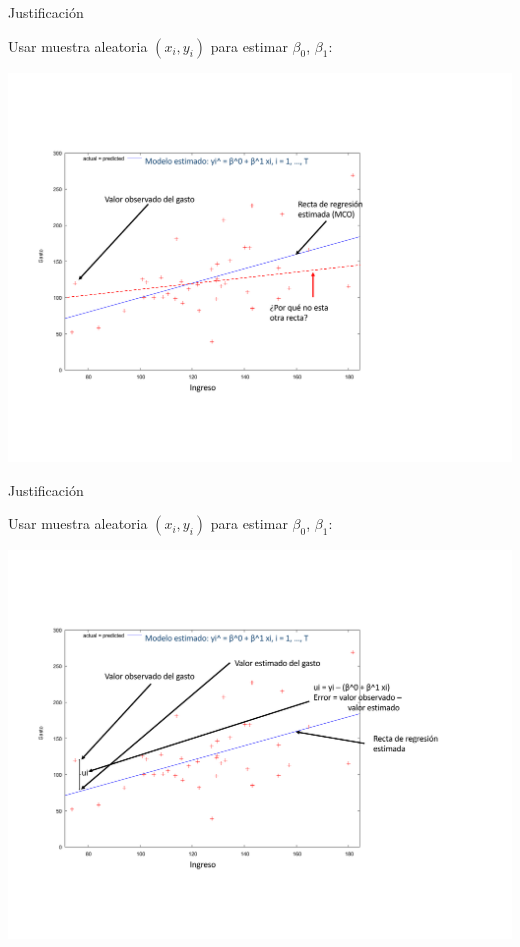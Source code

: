 \documentclass[11pt,handout]{beamer}
\begin{document}
\begin{frame}
{Justificación}

\pause 

Usar muestra aleatoria $(x_i, y_i)$ para estimar $\beta_0$, $\beta_1$:

\pause 
\vspace{-2cm}
\begin{center}
	\includegraphics[scale=.45]{fig2-11.pdf} 
\end{center}

\end{frame}

\begin{frame}
{Justificación}

\pause 

Usar muestra aleatoria $(x_i, y_i)$ para estimar $\beta_0$, $\beta_1$:

\pause 
\vspace{-2cm}
\begin{center}
	\includegraphics[scale=.45]{fig2-2.pdf} 
\end{center}

\end{frame}
\end{document}
